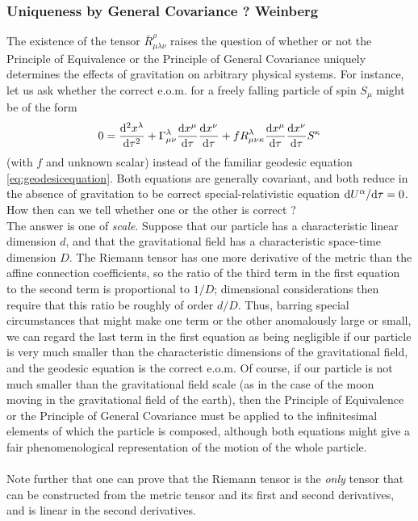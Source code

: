 \subsubsection{Uniqueness by General Covariance ? Weinberg}
The existence of the tensor $\bar{R}^\rho_{\mu \lambda \nu}$ raises the question of whether or not the Principle of Equivalence or the Principle of General Covariance uniquely determines the effects of gravitation on arbitrary physical systems. For instance, let us ask whether the correct e.o.m. for a freely falling particle of spin $S_\mu$ might be of the form
\begin{equation}
	0 = \frac{\mathrm{d}^2 x^\lambda}{\mathrm{d} \tau^2} + \Gamma^\lambda_{\mu \nu} \frac{\mathrm{d} x^\mu}{\mathrm{d} \tau} \frac{\mathrm{d} x^\nu}{\mathrm{d} \tau} + f R^\lambda_{\mu \nu \kappa} \frac{\mathrm{d} x^\mu}{\mathrm{d} \tau} \frac{\mathrm{d} x^\nu}{\mathrm{d} \tau} S^\kappa
\end{equation}
(with $f$ and unknown scalar) instead of the familiar geodesic equation \ref{eq:geodesicequation}. Both equations are generally covariant, and both reduce in the absence of gravitation to be correct special-relativistic equation $\mathrm{d} U^\alpha /\mathrm{d} \tau =0$. How then can we tell whether one or the other is correct ?\\
The answer is one of \emph{scale}. Suppose that our particle has a characteristic linear dimension $d$, and that the gravitational field has a characteristic space-time dimension $D$. The Riemann tensor has one more derivative of the metric than the affine connection coefficients, so the ratio of the third term in the first equation to the second term is proportional to $1/D$; dimensional considerations then require that this ratio be roughly of order $d/D$. Thus, barring special circumstances that might make one term or the other anomalously large or small, we can regard the last term in the first equation as being negligible if our particle is very much smaller than the characteristic dimensions of the gravitational field, and the geodesic equation is the correct e.o.m. Of course, if our particle is not much smaller than the gravitational field scale (as in the case of the moon moving in the gravitational field of the earth), then the Principle of Equivalence or the Principle of General Covariance must be applied to the infinitesimal elements of which the particle is composed, although both equations might give a fair phenomenological representation of the motion of the whole particle.\\
\\
Note further that one can prove that the Riemann tensor is the \emph{only} tensor that can be constructed from the metric tensor and its first and second derivatives, and is linear in the second derivatives.






